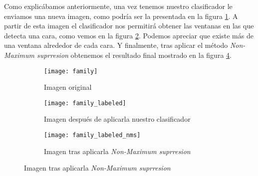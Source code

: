 Como explicábamos anteriormente, una vez tenemos nuestro clasificador le enviamos una nueva imagen, como podría ser la presentada en la figura \ref{subfig:family}. A partir de esta imagen el clasificador nos permitirá obtener las ventanas en las que detecta una cara, como vemos en la figura \ref{subfig:family_labeled}. Podemos apreciar que existe más de una ventana alrededor de cada cara. Y finalmente, tras aplicar el método \textit{Non-Maximum suprresion} obtenemos el resultado final mostrado en la figura \ref{subfig:family_labeled_nms}.

\begin{figure}
	\centering
	\begin{subfigure}[b]{0.45\textwidth}
        \texttt{[image: family]}
        \caption{Imagen original}
        \label{subfig:family}
    \end{subfigure}
    \begin{subfigure}[b]{0.45\textwidth}
        \texttt{[image: family\_labeled]}
        \caption{Imagen después de aplicarla nuestro clasificador}
        \label{subfig:family_labeled}
    \end{subfigure}
    \begin{subfigure}[b]{0.45\textwidth}
        \texttt{[image: family\_labeled\_nms]}
        \caption{Imagen tras aplicarla \textit{Non-Maximum suprresion}}
         \label{subfig:family_labeled_nms}
    \end{subfigure}
\end{figure}